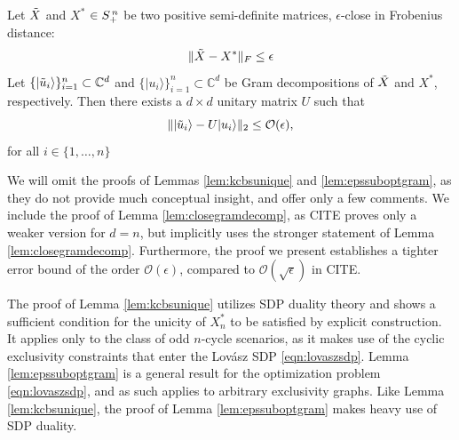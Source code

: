 \begin{lemma}
\label{lem:closegramdecomp}
Let $\Tilde{X}$ and $X^*$ $\in S_{+}^{\thinspace n}$ be two positive semi-definite matrices, $\epsilon$-close in Frobenius distance:
\begin{equation*}
\|\Tilde{X}-X^*\|_F \leq \epsilon
\end{equation*}
Let $\{\vert \Tilde{u}_i \rangle\}_{i=1}^n\subset\mathbb{C}^{d}$ and $\{\vert u_i\rangle\}_{i=1}^n\subset\mathbb{C}^{d}$ be Gram decompositions of $\Tilde{X}$ and $X^*$, respectively. Then there exists a $d\times d$ unitary matrix $U$ such that
\begin{equation*}
    \|\vert \Tilde{u}_i\rangle - U \vert u_i\rangle\|_2 \leq \mathcal{O}(\epsilon),
\end{equation*}
for all $i\in\{1,\dots,n\}$
\end{lemma}

We will omit the proofs of Lemmas \ref{lem:kcbsunique} and \ref{lem:epssuboptgram}, as they do not provide much conceptual insight, and offer only a few comments. We include the proof of Lemma \ref{lem:closegramdecomp}, as CITE proves only a weaker version for $d=n$, but implicitly uses the stronger statement of Lemma \ref{lem:closegramdecomp}. Furthermore, the proof we present establishes a tighter error bound of the order $\mathcal{O}(\epsilon)$, compared to $\mathcal{O}(\sqrt{\epsilon})$ in CITE.

The proof of Lemma \ref{lem:kcbsunique} utilizes SDP duality theory and shows a sufficient condition for the unicity of $X^*_n$ to be satisfied by explicit construction. It applies only to the class of odd $n$-cycle scenarios, as it makes use of the cyclic exclusivity constraints that enter the Lovász SDP \ref{eqn:lovaszsdp}. Lemma \ref{lem:epssuboptgram} is a general result for the optimization problem \ref{eqn:lovaszsdp}, and as such applies to arbitrary exclusivity graphs. Like Lemma \ref{lem:kcbsunique}, the proof of Lemma \ref{lem:epssuboptgram} makes heavy use of SDP duality. 

